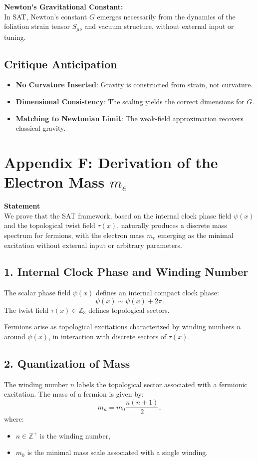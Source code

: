 \documentclass[12pt]{article}
\begin{document}
\begin{mdframed}[linewidth=1pt, roundcorner=5pt, backgroundcolor=white]
\textbf{Newton’s Gravitational Constant:} \\
In SAT, Newton’s constant \( G \) emerges necessarily from the dynamics of the foliation strain tensor \( S_{\mu\nu} \) and vacuum structure, without external input or tuning.
\end{mdframed}

\subsection*{Critique Anticipation}
\begin{itemize}
    \item \textbf{No Curvature Inserted}: Gravity is constructed from strain, not curvature.
    \item \textbf{Dimensional Consistency}: The scaling yields the correct dimensions for \(G\).
    \item \textbf{Matching to Newtonian Limit}: The weak-field approximation recovers classical gravity.
\end{itemize}

\newpage
\section*{Appendix F: Derivation of the Electron Mass \(m_e\)}

\textbf{Statement} \\
We prove that the SAT framework, based on the internal clock phase field \(\psi(x)\) and the topological twist field \(\tau(x)\), naturally produces a discrete mass spectrum for fermions, with the electron mass \(m_e\) emerging as the minimal excitation without external input or arbitrary parameters.

\subsection*{1. Internal Clock Phase and Winding Number}
The scalar phase field \(\psi(x)\) defines an internal compact clock phase:
\[
\psi(x) \sim \psi(x) + 2\pi.
\]
The twist field \(\tau(x) \in \mathbb{Z}_3\) defines topological sectors.

Fermions arise as topological excitations characterized by winding numbers \(n\) around \(\psi(x)\), in interaction with discrete sectors of \(\tau(x)\).

\subsection*{2. Quantization of Mass}
The winding number \(n\) labels the topological sector associated with a fermionic excitation. The mass of a fermion is given by:
\[
m_n = m_0 \frac{n(n+1)}{2},
\]
where:
\begin{itemize}
    \item \(n \in \mathbb{Z}^+\) is the winding number,
    \item \(m_0\) is the minimal mass scale associated with a single winding.
\end{itemize}
\end{document}
